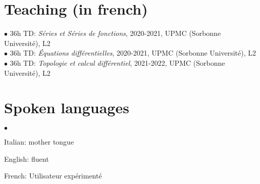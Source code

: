 \documentclass[margin,line,pifont,palatino,courier]{res}
\newenvironment{list2}{
  \begin{list}{$\bullet$}{%
      \setlength{\itemsep}{0in}
      \setlength{\parsep}{0in} \setlength{\parskip}{0in}
      \setlength{\topsep}{0in} \setlength{\partopsep}{0in}
      \setlength{\leftmargin}{0.2in}}}{\end{list}}
\begin{document}
\begin{resume}
\section{\sc Teaching (in french)} $\bullet$ 36h TD: \emph{S\'eries et S\'eries de fonctions}, 2020-2021, UPMC (Sorbonne Universit\'e), L2\\
$\bullet$ 36h TD: \emph{\'Equations diff\'erentielles}, 2020-2021, UPMC (Sorbonne Universit\'e), L2\\
$\bullet$ 36h TD: \emph{Topologie et calcul diff\'erentiel}, 2021-2022, UPMC (Sorbonne Universit\'e), L2\\


\section{\sc Spoken languages} \begin{list2}
\vspace*{.05in}
\item  Italian: mother tongue
\item English: fluent
\item French: Utilisateur exp\'eriment\'e
\end{list2}




\end{resume}
\end{document}
